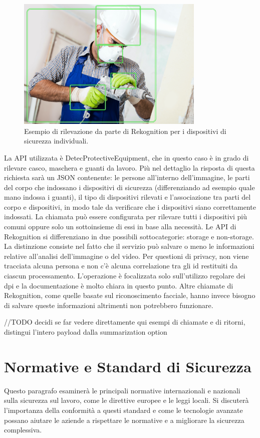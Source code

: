 \begin{figure}[htbp]
    \centering
    \includegraphics[width=0.8\textwidth]{figures/worker-with-bb.png}
    \caption{Esempio di rilevazione da parte di Rekognition per i dispositivi di sicurezza individuali.}
    \label{fig:ppe-example}
\end{figure}

\noindent La API utilizzata è DetecProtectiveEquipment, che in questo caso è in grado di rilevare casco, maschera e guanti da lavoro. Più nel dettaglio la risposta di questa richiesta sarà un JSON contenente: le persone all'interno dell'immagine, le parti del corpo che indossano i dispositivi di sicurezza (differenziando ad esempio quale mano indossa i guanti), il tipo di dispositivi rilevati e l'associazione tra parti del corpo e dispositivi, in modo tale da verificare che i dispositivi siano correttamente indossati. La chiamata può essere configurata per rilevare tutti i dispositivi più comuni oppure solo un sottoinsieme di essi in base alla necessità. Le API di Rekognition si differenziano in due possibili sottocategorie: storage e non-storage. La distinzione consiste nel fatto che il servizio può salvare o meno le informazioni relative all'analisi dell'immagine o del video. Per questioni di privacy, non viene tracciata alcuna persona e non c'è alcuna correlazione tra gli id restituiti da ciascun processamento. L'operazione è focalizzata solo sull'utilizzo regolare dei dpi e la documentazione è molto chiara in questo punto. Altre chiamate di Rekognition, come quelle basate sul riconoscimento facciale, hanno invece bisogno di salvare queste informazioni altrimenti non potrebbero funzionare.

//TODO decidi se far vedere direttamente qui esempi di chiamate e di ritorni, distingui l'intero payload dalla summarization option

 

\section{Normative e Standard di Sicurezza}

Questo paragrafo esaminerà le principali normative internazionali e nazionali sulla sicurezza sul lavoro, come le direttive europee e le leggi locali. Si discuterà l'importanza della conformità a questi standard e come le tecnologie avanzate possano aiutare le aziende a rispettare le normative e a migliorare la sicurezza complessiva.
